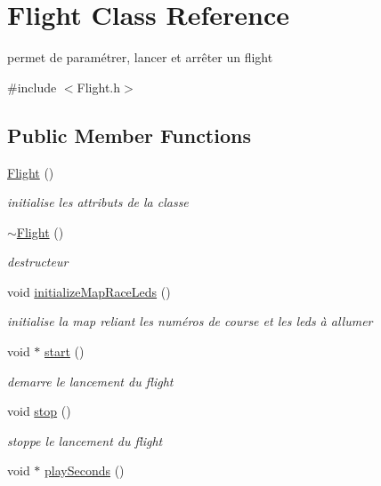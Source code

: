 \hypertarget{class_flight}{}\section{Flight Class Reference}
\label{class_flight}


permet de paramétrer, lancer et arrêter un flight  




{\ttfamily \#include $<$Flight.\+h$>$}

\subsection*{Public Member Functions}
\begin{DoxyCompactItemize}
\item 
\hyperlink{class_flight_acbf1e8c321e01e04db2fe651a08b30af}{Flight} ()
\begin{DoxyCompactList}\small\item\em initialise les attributs de la classe \end{DoxyCompactList}\item 
\hyperlink{class_flight_a6e9898949b83cfbc068b4d5820990782}{$\sim$\+Flight} ()
\begin{DoxyCompactList}\small\item\em destructeur \end{DoxyCompactList}\item 
void \hyperlink{class_flight_a8dbcde73f89d46cfeeb9e5892c1c7400}{initialize\+Map\+Race\+Leds} ()
\begin{DoxyCompactList}\small\item\em initialise la map reliant les numéros de course et les leds à allumer \end{DoxyCompactList}\item 
void $\ast$ \hyperlink{class_flight_ac5b91d4615b20ee19f9f113cb061313c}{start} ()
\begin{DoxyCompactList}\small\item\em demarre le lancement du flight \end{DoxyCompactList}\item 
void \hyperlink{class_flight_a42aa7eb78de33bc6cae6e0a0a569e9eb}{stop} ()
\begin{DoxyCompactList}\small\item\em stoppe le lancement du flight \end{DoxyCompactList}\item 
void $\ast$ \hyperlink{class_flight_a84fa12f82e85f6e708249d6a634c5923}{play\+Seconds} ()

\end{DoxyCompactItemize}
